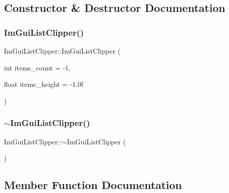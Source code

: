 \subsection{Constructor \& Destructor Documentation}
\hypertarget{struct_im_gui_list_clipper_a0dc870fa31a56d3ace7625450f42937a}{}\label{struct_im_gui_list_clipper_a0dc870fa31a56d3ace7625450f42937a} 
\subsubsection{\texorpdfstring{Im\+Gui\+List\+Clipper()}{ImGuiListClipper()}}
{\footnotesize\ttfamily Im\+Gui\+List\+Clipper\+::\+Im\+Gui\+List\+Clipper (\begin{DoxyParamCaption}\item[{int}]{items\+\_\+count = {\ttfamily -\/1},  }\item[{float}]{items\+\_\+height = {\ttfamily -\/1.0f} }\end{DoxyParamCaption})}

\hypertarget{struct_im_gui_list_clipper_ada915f0ae4446df73c1a2372bde65293}{}\label{struct_im_gui_list_clipper_ada915f0ae4446df73c1a2372bde65293} 
\subsubsection{\texorpdfstring{$\sim$\+Im\+Gui\+List\+Clipper()}{~ImGuiListClipper()}}
{\footnotesize\ttfamily Im\+Gui\+List\+Clipper\+::$\sim$\+Im\+Gui\+List\+Clipper (\begin{DoxyParamCaption}{ }\end{DoxyParamCaption})}



\subsection{Member Function Documentation}
\hypertarget{struct_im_gui_list_clipper_a746fbd724a41dbe88fef4875a2b1e9c7}{}\label{struct_im_gui_list_clipper_a746fbd724a41dbe88fef4875a2b1e9c7} 
